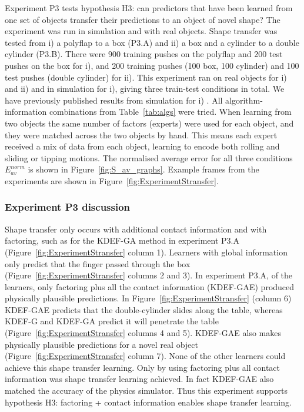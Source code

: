 Experiment P3 tests hypothesis H3: can predictors that have been learned from one set of objects transfer their predictions to an object of novel shape? The experiment was run in simulation and with real objects. Shape transfer was tested from i) a polyflap to a box (P3.A) and ii) a box and a cylinder to a double cylinder (P3.B). There were 900 training pushes on the polyflap and 200 test pushes on the box for i), and 200 training pushes (100 box, 100 cylinder) and 100 test pushes (double cylinder) for ii). This experiment ran on real objects for i) and ii) and in simulation for i), giving three train-test conditions in total. We have previously published results from simulation for i) \citep{kopicki-etal-icra11}. All algorithm-information combinations from Table~\ref{tab:algs} were tried. When learning from two objects the same number of factors (experts) were used for each object, and they were matched across the two objects by hand. This means each expert received a mix of data from each object, learning to encode both rolling and sliding or tipping motions.  The normalised average error for all three conditions $E_{av}^{norm}$ is shown in Figure~\ref{fig:S_av_graphs}. Example frames from the experiments are shown in Figure~\ref{fig:ExperimentStransfer}.

\subsubsection{Experiment P3 discussion} Shape transfer only occurs with additional contact information and with factoring, such as for the
KDEF-GA method in experiment P3.A (Figure~\ref{fig:ExperimentStransfer} column 1).  Learners with global information only predict that the finger passed  through the box (Figure~\ref{fig:ExperimentStransfer} columns 2 and 3). In experiment P3.A, of the learners, only factoring plus all the contact information (KDEF-GAE) produced physically plausible predictions. In Figure~\ref{fig:ExperimentStransfer} (column 6) KDEF-GAE predicts that the double-cylinder slides along the table, whereas KDEF-G and KDEF-GA predict it will penetrate the table (Figure~\ref{fig:ExperimentStransfer} columns 4 and 5). KDEF-GAE also makes physically plausible predictions for a novel real object 
(Figure~\ref{fig:ExperimentStransfer} column 7). None of the other learners could achieve this shape transfer learning. Only by using factoring plus all contact information was shape transfer learning achieved. In fact KDEF-GAE also matched the accuracy of the physics simulator. Thus this experiment supports hypothesis H3: factoring + contact information enables shape transfer learning.


